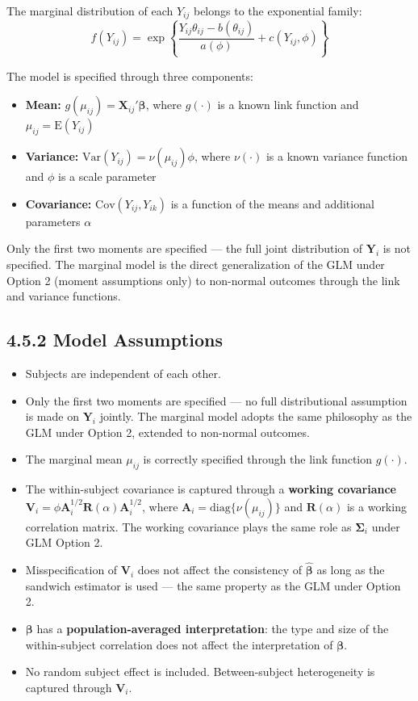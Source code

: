 \documentclass[11pt]{article}
\newcommand{\bY}{\mathbf{Y}}
\newcommand{\bbeta}{\boldsymbol{\beta}}
\newcommand{\bSigma}{\boldsymbol{\Sigma}}
\newcommand{\E}{\mathrm{E}}
\newcommand{\Var}{\mathrm{Var}}
\newcommand{\Cov}{\mathrm{Cov}}
\begin{document}
The marginal distribution of each $Y_{ij}$ belongs to the exponential family:
$$f(Y_{ij}) = \exp\left\{\frac{Y_{ij}\theta_{ij} - b(\theta_{ij})}{a(\phi)} + c(Y_{ij}, \phi)\right\}$$

The model is specified through three components:
\begin{itemize}[leftmargin=2em]
  \item \textbf{Mean:} $g(\mu_{ij}) = \mathbf{X}_{ij}'\bbeta$, where $g(\cdot)$ is a known link function and $\mu_{ij} = \E(Y_{ij})$
  \item \textbf{Variance:} $\Var(Y_{ij}) = \nu(\mu_{ij})\phi$, where $\nu(\cdot)$ is a known variance function and $\phi$ is a scale parameter
  \item \textbf{Covariance:} $\Cov(Y_{ij}, Y_{ik})$ is a function of the means and additional parameters $\alpha$
\end{itemize}

Only the first two moments are specified --- the full joint distribution of $\bY_i$ is not specified. The marginal model is the direct generalization of the GLM under Option 2 (moment assumptions only) to non-normal outcomes through the link and variance functions.

\subsection*{4.5.2 Model Assumptions}

\begin{itemize}[leftmargin=2em]
  \item Subjects are independent of each other.
  \item Only the first two moments are specified --- no full distributional assumption is made on $\bY_i$ jointly. The marginal model adopts the same philosophy as the GLM under Option 2, extended to non-normal outcomes.
  \item The marginal mean $\mu_{ij}$ is correctly specified through the link function $g(\cdot)$.
  \item The within-subject covariance is captured through a \textbf{working covariance} $\mathbf{V}_i = \phi\mathbf{A}_i^{1/2}\mathbf{R}(\alpha)\mathbf{A}_i^{1/2}$, where $\mathbf{A}_i = \mathrm{diag}\{\nu(\mu_{ij})\}$ and $\mathbf{R}(\alpha)$ is a working correlation matrix. The working covariance plays the same role as $\bSigma_i$ under GLM Option 2.
  \item Misspecification of $\mathbf{V}_i$ does not affect the consistency of $\hat{\bbeta}$ as long as the sandwich estimator is used --- the same property as the GLM under Option 2.
  \item $\bbeta$ has a \textbf{population-averaged interpretation}: the type and size of the within-subject correlation does not affect the interpretation of $\bbeta$.
  \item No random subject effect is included. Between-subject heterogeneity is captured through $\mathbf{V}_i$.
\end{itemize}
\end{document}
